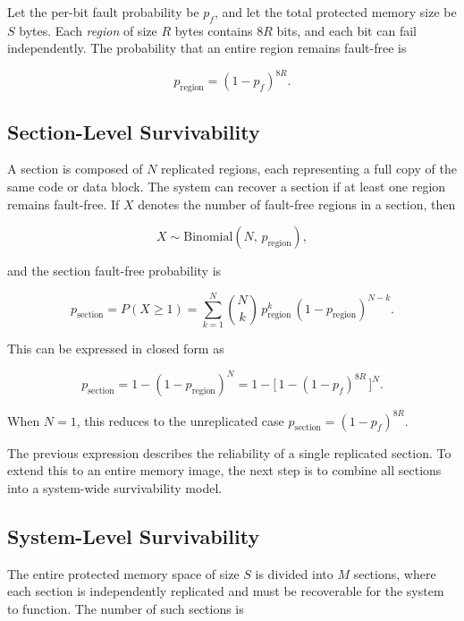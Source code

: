 Let the per-bit fault probability be $p_f$, and let the total protected memory size be $S$ bytes. 
Each \textit{region} of size $R$ bytes contains $8R$ bits, and each bit can fail independently. 
The probability that an entire region remains fault-free is

\begin{equation}
p_{\text{region}} = (1 - p_f)^{8R}.
\end{equation}

\subsection*{Section-Level Survivability}

A section is composed of $N$ replicated regions, each representing a full copy of the same 
code or data block. The system can recover a section if at least one region remains fault-free. 
If $X$ denotes the number of fault-free regions in a section, then

\begin{equation}
X \sim \mathrm{Binomial}(N,\, p_{\text{region}}),
\end{equation}

and the section fault-free probability is

\begin{equation}
p_{\text{section}} = P(X \ge 1)
= \sum_{k=1}^{N} \binom{N}{k}\, p_{\text{region}}^{k}\, (1 - p_{\text{region}})^{N-k}.
\end{equation}

This can be expressed in closed form as

\begin{equation}
p_{\text{section}} = 1 - (1 - p_{\text{region}})^{N}
= 1 - \Big[\,1 - (1 - p_f)^{8R}\,\Big]^{N}.
\end{equation}

When $N = 1$, this reduces to the unreplicated case 
$p_{\text{section}} = (1 - p_f)^{8R}$.


The previous expression describes the reliability of a single replicated section. 
To extend this to an entire memory image, the next step is to combine all sections into a 
system-wide survivability model.


\subsection*{System-Level Survivability}

The entire protected memory space of size $S$ is divided into $M$ sections, 
where each section is independently replicated and must be recoverable 
for the system to function. The number of such sections is


